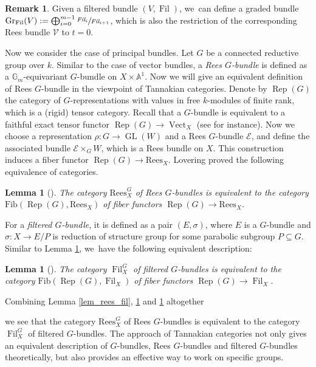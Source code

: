 \documentclass[JEP,XML,SOM,Unicode,published]{cedram}
\newcommand{\Fil}{\textit{Fil}}
\newcommand{\Fib}{\mathrm{Fib}}
\newcommand{\Rees}{\mathrm{Rees}}
\DeclareMathOperator{\Filt}{Fil}
\DeclareMathOperator{\GL}{GL}
\DeclareMathOperator{\Rep}{Rep}
\DeclareMathOperator{\Vect}{Vect}
\newcommand{\Gr}{\mathrm{Gr}}
\theoremstyle{plain}
\newtheorem{lem}[thm]{Lemma}
\theoremstyle{definition}
\newtheorem{rem}[thm]{Remark}
\begin{document}
\begin{rem}\label{rem_graded}
Given a filtered bundle $(V, \Filt)$, we~can define a graded bundle $\Gr_{\Filt}(V) := \bigoplus_{i=0}^{m-1} \sfrac{\Fil_i}{\Fil_{i+1}}$, which is also the restriction of the corresponding Rees bundle $\mathcal{V}$ to $t= 0$.
\end{rem}

Now we consider the case of principal bundles. Let $G$ be a connected reductive group over $k$. Similar to the case of vector bundles, a \emph{Rees $G$-bundle} is defined as a $\mathbb{G}_m$-equivariant $G$-bundle on $X \times \mathbb{A}^1$. Now we will give an equivalent definition of Rees $G$-bundle in the viewpoint of Tannakian categories. Denote by $\Rep(G)$ the category of $G$-representations with values in free $k$-modules of finite rank, which is a (rigid) tensor category. Recall that a $G$-bundle is equivalent to a faithful exact tensor functor $\Rep(G) \to \Vect_X$ (see \cite[\S 6]{Si92} for instance). Now we choose a representation $\rho : G \to \GL(W)$ and a Rees $G$-bundle $\mathcal{E}$, and define the associated bundle $\mathcal{E} \times_G W$, which is a Rees bundle on $X$. This construction induces a fiber functor $\Rep(G) \to \Rees_X$. Lovering proved the following equivalence of categories.

\begin{lem}[{\cite[Prop.\,2.2.7]{Lo17b}}]\label{lem_rees_G}
The category $\Rees^G_X$ of Rees $G$-bundles is equivalent to the category $\Fib(\Rep(G), \Rees_X)$ of fiber functors $\Rep(G) \to \Rees_X$.
\end{lem}

For a \emph{filtered $G$-bundle}, it is defined as a pair $(E,\sigma)$, where $E$ is a $G$-bundle and $\sigma: X \to E/P$ is reduction of structure group for some parabolic subgroup $P \subseteq G$. Similar to Lemma \ref{lem_rees_G}, we~have the following equivalent description:

\begin{lem}[{\cite[\S3]{Lo17a}}]\label{lem_fil_G}
The category $\Filt_X^G$ of filtered $G$-bundles is equivalent to the category $\Fib(\Rep(G), \Filt_X)$ of fiber functors $\Rep(G) \to \Filt_X$.
\end{lem}

Combining Lemma \ref{lem_rees_fil}, \ref{lem_rees_G} and \ref{lem_fil_G} altogether
\begin{center}
\end{center}
we see that the category $\Rees^G_X$ of Rees $G$-bundles is equivalent to the category $\Filt^G_X$ of filtered $G$-bundles. The approach of Tannakian categories not only gives an equivalent description of $G$-bundles, Rees $G$-bundles and filtered $G$-bundles theoretically, but also provides an effective way to work on specific groups.
\end{document}
